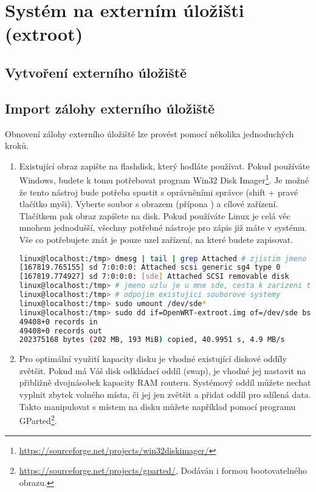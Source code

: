 \section{Systém na externím úložišti (extroot)}
\subsection{Vytvoření externího úložiště}

\subsection{Import zálohy externího úložiště}
Obnovení zálohy externího úložiště lze provést pomocí několika jednoduchých
kroků.
\begin{enumerate}
\item Existující obraz zapište na flashdisk, který hodláte používat.
Pokud používáte Windows, budete k tomu potřebovat program Win32 Disk
Imager\footnote{\url{https://sourceforge.net/projects/win32diskimager/}}.
Je možné že tento nástroj bude potřeba spustit s oprávněními správce
(shift + pravé tlačítko myši). Vyberte soubor s obrazem (přípona )
a cílové zařízení. Tlačítkem  pak obraz zapíšete na disk. Pokud
používáte Linux je celá věc mnohem jednodušší, všechny potřebné nástroje
pro zápis již máte v systému. Vše co potřebujete znát je pouze uzel zařízení,
na které budete zapisovat.
\begin{lstlisting}[language=sh]
linux@localhost:/tmp> dmesg | tail | grep Attached # zjistim jmeno uzlu
[167819.765155] sd 7:0:0:0: Attached scsi generic sg4 type 0
[167819.774927] sd 7:0:0:0: [sde] Attached SCSI removable disk
linux@localhost:/tmp> # jmeno uzlu je u mne sde, cesta k zarizeni tedy /dev/sde
linux@localhost:/tmp> # odpojim existujici souborove systemy
linux@localhost:/tmp> sudo umount /dev/sde*
linux@localhost:/tmp> sudo dd if=OpenWRT-extroot.img of=/dev/sde bs=4K
49408+0 records in
49408+0 records out
202375168 bytes (202 MB, 193 MiB) copied, 40.9951 s, 4.9 MB/s
\end{lstlisting}
\item Pro optimální využití kapacity disku je vhodné existující diskové
oddíly zvětšit. Pokud má Váš disk odkládací oddíl (swap), je vhodné jej
nastavit na přibližně dvojnásobek kapacity RAM routeru. Systémový oddíl
můžete nechat vyplnit zbytek volného místa, či jej jen zvětšit a přidat
oddíl pro sdílená data. Takto manipulovat s místem na disku můžete například
pomocí programu GParted\footnote{\url{https://sourceforge.net/projects/gparted/},
Dodáván i formou bootovatelného obrazu.}.
\end{enumerate}

